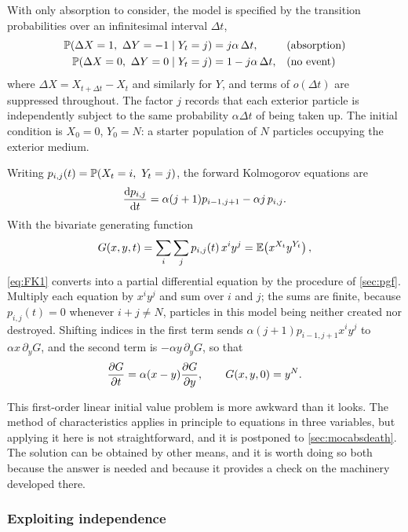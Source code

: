 With only absorption to consider, the model is specified by the transition
probabilities over an infinitesimal interval $\Delta t$,
\begin{align*}
\mathbb{P}\!\left(\Delta X = 1,\ \Delta Y = -1 \mid Y_t = j\right) &= j\alpha\,\Delta t, &&\text{(absorption)}\\
\mathbb{P}\!\left(\Delta X = 0,\ \Delta Y = 0 \mid Y_t = j\right) &= 1-j\alpha\,\Delta t, &&\text{(no event)}
\end{align*}
where $\Delta X = X_{t+\Delta t}-X_t$ and similarly for $Y$, and terms of
$o(\Delta t)$ are suppressed throughout. The factor $j$ records that each exterior
particle is independently subject to the same probability $\alpha\Delta t$ of being
taken up. The initial condition is $X_0=0$, $Y_0=N$: a starter population of $N$
particles occupying the exterior medium.

Writing $p_{i,j}(t) = \pr{X_t=i,\ Y_t=j}$, the forward Kolmogorov equations are
\begin{equation}
\label{eq:FK1}
\frac{\mathrm{d} p_{i,j}}{\mathrm{d} t} = \alpha(j+1)p_{i-1,j+1} - \alpha j\,p_{i,j} .
\end{equation}
With the bivariate generating function
\begin{equation}
\label{eq:pgfDef}
G(x,y,t) = \sum_i\sum_j p_{i,j}(t)\,x^iy^j = \mathbb{E}\!\left(x^{X_t}y^{Y_t}\right),
\end{equation}
\cref{eq:FK1} converts into a partial differential equation by the procedure of
\cref{sec:pgf}. Multiply each equation by $x^iy^j$ and sum over $i$ and $j$; the
sums are finite, because $p_{i,j}(t)=0$ whenever $i+j\neq N$, particles in this
model being neither created nor destroyed. Shifting indices in the first term
sends $\alpha(j+1)p_{i-1,j+1}x^iy^j$ to $\alpha x\,\partial_yG$, and the second
term is $-\alpha y\,\partial_yG$, so that
\begin{equation}
\label{eq:PDE1}
\frac{\partial G}{\partial t} = \alpha(x-y)\frac{\partial G}{\partial y},
\qquad G(x,y,0) = y^N .
\end{equation}

This first-order linear initial value problem is more awkward than it looks. The
method of characteristics applies in principle to equations in three variables, but
applying it here is not straightforward, and it is postponed to
\cref{sec:mocabsdeath}. The solution can be obtained by other means, and it is
worth doing so both because the answer is needed and because it provides a check on
the machinery developed there.

\subsubsection*{Exploiting independence}

